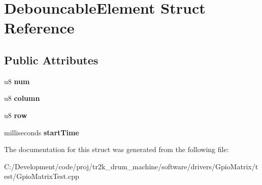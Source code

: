 \hypertarget{struct_debouncable_element}{}\section{Debouncable\+Element Struct Reference}
\label{struct_debouncable_element}
\subsection*{Public Attributes}
\begin{DoxyCompactItemize}
\item 
\mbox{\label{struct_debouncable_element_a9e4829893d1e2aee3bea1fa9ed68568a}} 
u8 {\bfseries num}
\item 
\mbox{\label{struct_debouncable_element_a291e32960eb9de2415ba1c4ca0ff56dd}} 
u8 {\bfseries column}
\item 
\mbox{\label{struct_debouncable_element_a831fd9eb3b3e4c019998f663ecbed0da}} 
u8 {\bfseries row}
\item 
\mbox{\label{struct_debouncable_element_aaacd04bc6f01d64b8f512a4738e6ebc5}} 
milliseconds {\bfseries start\+Time}
\end{DoxyCompactItemize}


The documentation for this struct was generated from the following file\+:\begin{DoxyCompactItemize}
\item 
C\+:/\+Development/code/proj/tr2k\+\_\+drum\+\_\+machine/software/drivers/\+Gpio\+Matrix/test/Gpio\+Matrix\+Test.\+cpp\end{DoxyCompactItemize}
